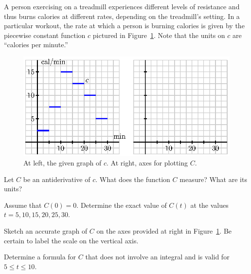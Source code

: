 \begin{exercises}
  \item A person exercising on a treadmill experiences different levels of resistance and thus burns calories at different rates, depending on the treadmill's setting.  In a particular workout, the rate at which a person is burning calories is given by the piecewise constant function $c$ pictured in Figure~\ref{F:5.1.Ez2}.  Note that the units on $c$ are ``calories per minute.''
  \begin{figure}[h]
\begin{center}
\includegraphics{figures/5_1_Ez2.eps}
\caption{At left, the given graph of $c$.  At right, axes for plotting $C$.} \label{F:5.1.Ez2}
\end{center}
\end{figure}
	\ba
		\item Let $C$ be an antiderivative of $c$.  What does the function $C$ measure?  What are its units?
		\item Assume that $C(0) = 0$.  Determine the exact value of $C(t)$ at the values $t = 5, 10, 15, 20, 25, 30$.
		\item Sketch an accurate graph of $C$ on the axes provided at right in Figure~\ref{F:5.1.Ez2}.  Be certain to label the scale on the vertical axis.
		\item Determine a formula for $C$ that does not involve an integral and is valid for $5 \le t \le 10$.
	\ea

\vfill 

\ 

\pagebreak


\end{exercises}
